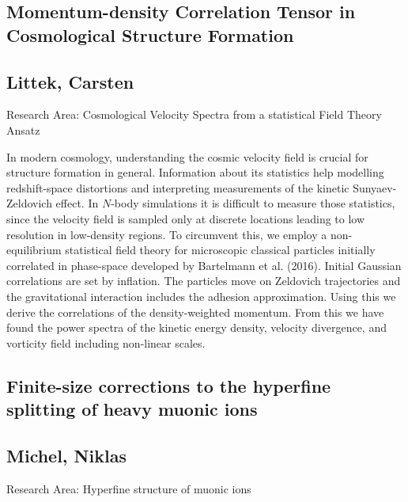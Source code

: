 \subsection*{\centering \large Momentum-density Correlation Tensor in Cosmological Structure Formation}
\subsection*{\centering \normalsize Littek, Carsten}
Research Area: Cosmological Velocity Spectra from a statistical Field Theory Ansatz\newline

\noindent In modern cosmology, understanding the cosmic velocity field is crucial for structure formation in general. Information about its statistics help modelling redshift-space distortions and interpreting measurements of the kinetic Sunyaev-Zeldovich effect. In $N$-body simulations it is difficult to measure those statistics, since the velocity field is sampled only at discrete locations leading to low resolution in low-density regions.\newline 
To circumvent this, we employ a non-equilibrium statistical field theory for microscopic classical particles initially correlated in phase-space developed by Bartelmann et al. (2016). Initial Gaussian correlations are set by inflation. The particles move on Zeldovich trajectories and the gravitational interaction includes the adhesion approximation.\newline
Using this we derive the correlations of the density-weighted momentum. From this we have found the power spectra of the kinetic energy density, velocity divergence, and vorticity field including non-linear scales.

\subsection*{\centering \large Finite-size corrections to the hyperfine splitting of heavy muonic ions}
\subsection*{\centering \normalsize Michel, Niklas}
Research Area: Hyperfine structure of muonic ions\newline

